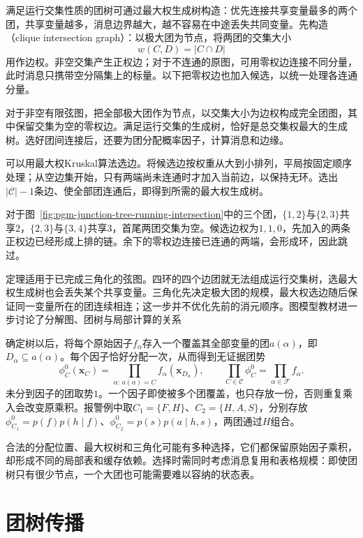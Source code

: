 满足运行交集性质的团树可通过最大权生成树构造：优先连接共享变量最多的两个团，共享变量越多，消息边界越大，越不容易在中途丢失共同变量。先构造（clique intersection graph）：以极大团为节点，将两团的交集大小
\[
  w(C,D)=|C\cap D|
\]
用作边权。非空交集产生正权边；对于不连通的原图，可用零权边连接不同分量，此时消息只携带空分隔集上的标量。以下把零权边也加入候选，以统一处理各连通分量。

对于非空有限弦图，把全部极大团作为节点，以交集大小为边权构成完全团图，其中保留交集为空的零权边。满足运行交集的生成树，恰好是总交集权最大的生成树。选好团间连接后，还要为团分配概率因子，计算消息和边缘。

可以用最大权Kruskal算法选边。将候选边按权重从大到小排列，平局按固定顺序处理；从空边集开始，只有两端尚未连通时才加入当前边，以保持无环。选出$|\mathcal C|-1$条边、使全部团连通后，即得到所需的最大权生成树。

对于图~\ref{fig:pgm-junction-tree-running-intersection}中的三个团，$\{1,2\}$与$\{2,3\}$共享$2$，$\{2,3\}$与$\{3,4\}$共享$3$，首尾两团交集为空。候选边权为$1,1,0$，先加入的两条正权边已经形成上排的链。余下的零权边连接已连通的两端，会形成环，因此跳过。

定理适用于已完成三角化的弦图。四环的四个边团就无法组成运行交集树，选最大权生成树也会丢失某个共享变量。三角化先决定极大团的规模，最大权选边随后保证同一变量所在的团连续相连；这一步并不优化先前的消元顺序。图模型教材进一步讨论了分解图、团树与局部计算的关系

确定树以后，将每个原始因子$f_\alpha$存入一个覆盖其全部变量的团$a(\alpha)$，即$D_\alpha\subseteq a(\alpha)$。每个因子恰好分配一次，从而得到无证据团势
\begin{equation}
  \phi_C^0(\bm{x}_C)
    =\prod_{\alpha:\,a(\alpha)=C}f_\alpha(\bm{x}_{D_\alpha}),
  \qquad
  \prod_{C\in\mathcal{C}}\phi_C^0
    =\prod_{\alpha\in\mathcal{F}}f_\alpha.
  \label{eq:pgm-junction-tree-factor-assignment}
\end{equation}
未分到因子的团取势$1$。一个因子即使被多个团覆盖，也只存放一份，否则重复乘入会改变原乘积。报警例中取$C_1=\{F,H\}$、$C_2=\{H,A,S\}$，分别存放$\phi_{C_1}^0=p(f)p(h\mid f)$、$\phi_{C_2}^0=p(s)p(a\mid h,s)$，两团通过$H$组合。

合法的分配位置、最大权树和三角化可能有多种选择，它们都保留原始因子乘积，却形成不同的局部表和缓存依赖。选择时需同时考虑消息复用和表格规模：即使团树只有很少节点，一个大团也可能需要难以容纳的状态表。

\section{团树传播}
\label{sec:pgm-junction-tree-propagation}

